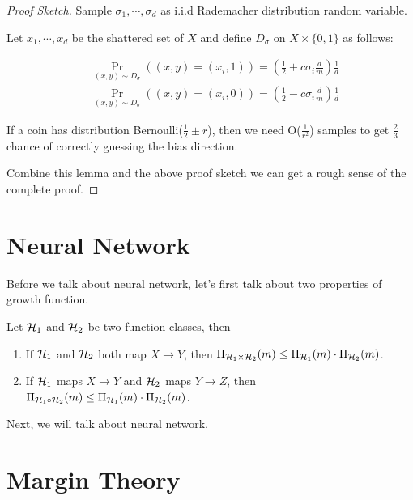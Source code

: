 \documentclass[../main.tex]{subfiles}
\begin{document}
		 \begin{proof}[Proof Sketch]
			Sample $\sigma_1, \cdots , \sigma_d$ as i.i.d Rademacher distribution random variable.
		 		
		 		Let $x_1, \cdots, x_d$ be the shattered set of $X$ and define $D_\sigma$ on $X \times \{0,1\}$ as follows:
		 		
 		\begin{equation}
 		\begin{aligned}
 	&\Pr\limits_{(x,y) \sim D_\sigma} ((x,y) = (x_i, 1)) = (\frac{1}{2} + c\sigma_i \frac{d}{m}) \frac{1}{d} \\
 	&\Pr\limits_{(x,y) \sim D_\sigma} ((x,y) = (x_i, 0)) = (\frac{1}{2} - c\sigma_i \frac{d}{m}) \frac{1}{d} 
 		\end{aligned}
 		\end{equation} 
 		
 		\begin{lemma}
 				If a coin has distribution Bernoulli($\frac{1}{2} \pm r $), then we need O($\frac{1}{r^2}$) samples to get $\frac{2}{3}$ chance of correctly guessing the bias direction.
 			\end{lemma}
 		
 			Combine this lemma and the above proof sketch we can get a rough sense of the complete proof.
		 \end{proof}
		 
		 
		 \section{Neural Network}
		 
		 Before we talk about neural network, let's first talk about two properties of growth function.
		 
		 \begin{fact}
		 	Let $\mathcal{H}_1$ and $\mathcal{H}_2$ be two function classes, then
		 	
		 	\begin{enumerate}
		 		\item If $\mathcal{H}_1$ and $\mathcal{H}_2$ both map $X\to Y$, then $\Pi_{\mathcal{H}_1 \times \mathcal{H}_2}(m) \leq \Pi_{\mathcal{H}_1}(m) \cdot \Pi_{\mathcal{H}_2}(m) $.
		 		\item If $\mathcal{H}_1$ maps $X\to Y$ and $\mathcal{H}_2$ maps $Y\to Z$, then  $\Pi_{\mathcal{H}_1 \circ \mathcal{H}_2}(m) \leq \Pi_{\mathcal{H}_1}(m) \cdot \Pi_{\mathcal{H}_2}(m) $.
		 	\end{enumerate}
		 \end{fact}
	 
	 Next, we will talk about neural network.
	 
	 	\section{Margin Theory}
\end{document}
